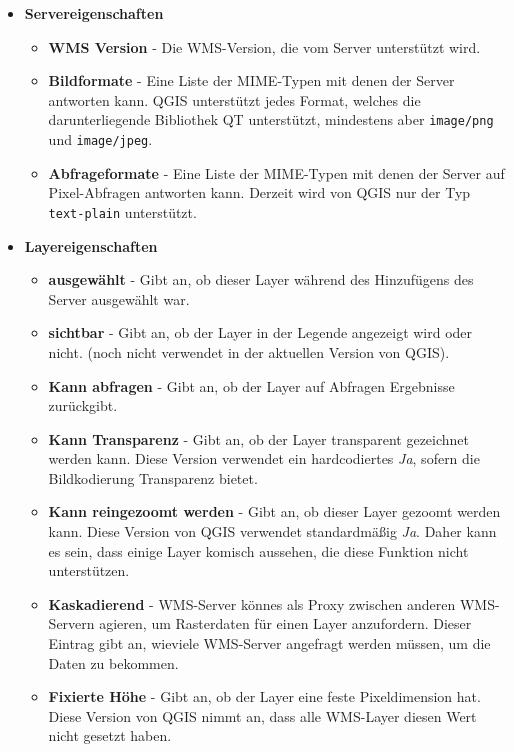 \begin{itemize}[label=--]
\item \textbf{Servereigenschaften}
\begin{itemize}[label=--]
\item \textbf{WMS Version}
    - Die WMS-Version, die vom Server unterstützt wird.
\item \textbf{Bildformate}    
    - Eine Liste der MIME-Typen mit denen der Server antworten kann. QGIS
      unterstützt jedes Format, welches die darunterliegende Bibliothek QT
      unterstützt, mindestens aber \texttt{image/png} und \texttt{image/jpeg}.
\item \textbf{Abfrageformate} 
    - Eine Liste der MIME-Typen mit denen der Server auf Pixel-Abfragen
      antworten kann. Derzeit wird von QGIS nur der Typ \texttt{text-plain}
      unterstützt.
\end{itemize}
\item \textbf{Layereigenschaften}
\begin{itemize}[label=--]
\item \textbf{ausgewählt}
    - Gibt an, ob dieser Layer während des Hinzufügens des Server ausgewählt
      war.
\item \textbf{sichtbar}
    - Gibt an, ob der Layer in der Legende angezeigt wird oder nicht. (noch
      nicht verwendet in der aktuellen Version von QGIS).
\item \textbf{Kann abfragen}
    - Gibt an, ob der Layer auf Abfragen Ergebnisse zurückgibt.
\item \textbf{Kann Transparenz}
    - Gibt an, ob der Layer transparent gezeichnet werden kann. Diese Version
      verwendet ein hardcodiertes \textsl{Ja}, sofern die Bildkodierung
      Transparenz bietet.
\item \textbf{Kann reingezoomt werden}
    - Gibt an, ob dieser Layer gezoomt werden kann. Diese Version von QGIS
      verwendet standardmäßig \textsl{Ja}. Daher kann es sein, dass einige
      Layer komisch aussehen, die diese Funktion nicht unterstützen.
\item \textbf{Kaskadierend}
    - WMS-Server könnes als Proxy zwischen anderen WMS-Servern agieren, um
      Rasterdaten für einen Layer anzufordern. Dieser Eintrag gibt an,
      wieviele WMS-Server angefragt werden müssen, um die Daten zu bekommen.
\item \textbf{Fixierte Höhe}
    - Gibt an, ob der Layer eine feste Pixeldimension hat. Diese Version von
      QGIS nimmt an, dass alle WMS-Layer diesen Wert nicht gesetzt haben.

\end{itemize}
\end{itemize}
